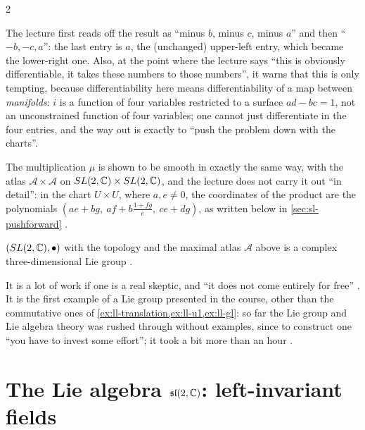 \begin{paracol}{2}
\begin{coursenote}
The lecture first reads off the result as ``minus $b$, minus $c$, minus $a$'' and then ``$-b,-c,a$'': the last entry is $a$, the (unchanged) upper-left entry, which became the lower-right one. Also, at the point where the lecture says ``this is obviously differentiable, it takes these numbers to those numbers'', it warns that this is only tempting, because differentiability here means differentiability of a map between \emph{manifolds}: $i$ is a function of four variables restricted to a surface $ad-bc=1$, not an unconstrained function of four variables; one cannot just differentiate in the four entries, and the way out is exactly to ``push the problem down with the charts''.    
\end{coursenote}
The multiplication $\mu$ is shown to be smooth in exactly the same way, with the atlas $\mathcal A\times\mathcal A$ on $SL(2,\mathbb{C})\times SL(2,\mathbb{C})$, and the lecture does not carry it out ``in detail'': in the chart $U\times U$, where $a,e\ne0$, the coordinates of the product are the polynomials $(ae+bg,\ af+b\frac{1+fg}{e},\ ce+dg)$, as written below in \cref{sec:sl-pushforward}    .
\begin{theorem}\label{thm:sl-liegroup}
$(SL(2,\mathbb{C}),\bullet)$ with the topology and the maximal atlas $\mathcal A$ above is a complex three-dimensional Lie group  .
\end{theorem}
It is a lot of work if one is a real skeptic, and ``it does not come entirely for free'' . It is the first example of a Lie group presented in the course, other than the commutative ones of \cref{ex:ll-translation,ex:ll-u1,ex:ll-gl}: so far the Lie group and Lie algebra theory was rushed through without examples, since to construct one ``you have to invest some effort''; it took a bit more than an hour  .

\section{The Lie algebra $\mathfrak{sl}(2,\mathbb{C})$: left-invariant fields}\label{sec:sl-algebra}


\end{paracol}
